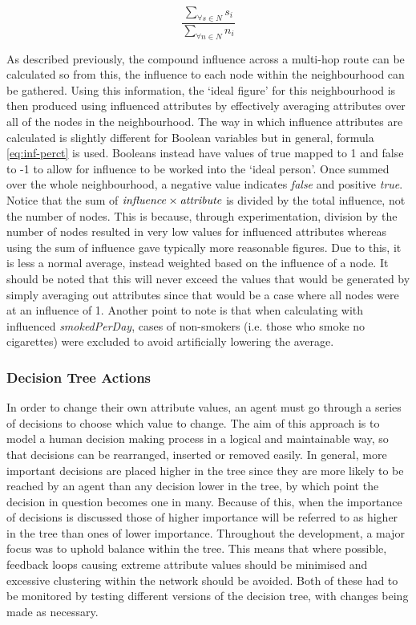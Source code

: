 \documentclass[]{report}
\begin{document}
\begin{equation}
\label{eq:inf-perct}
\frac{\sum_{\forall s \in N} s_{i}}{\sum_{\forall n \in N} n_{i}}
\end{equation}

As described previously, the compound influence across a multi-hop route can be calculated so from this, the influence to each node within the neighbourhood can be gathered. Using this information, the `ideal figure' for this neighbourhood is then produced using influenced attributes by effectively averaging attributes over all of the nodes in the neighbourhood. The way in which influence attributes are calculated is slightly different for Boolean variables but in general, formula \ref{eq:inf-perct} is used. Booleans instead have values of true mapped to 1 and false to -1 to allow for influence to be worked into the `ideal person'. Once summed over the whole neighbourhood, a negative value indicates \emph{false} and positive \emph{true}. Notice that the sum of $\text{\emph{influence}} \times \text{\emph{attribute}}$ is divided by the total influence, not the number of nodes. This is because, through experimentation, division by the number of nodes resulted in very low values for influenced attributes whereas using the sum of influence gave typically more reasonable figures. Due to this, it is less a normal average, instead weighted based on the influence of a node. It should be noted that this will never exceed the values that would be generated by simply averaging out attributes since that would be a case where all nodes were at an influence of 1. Another point to note is that when calculating with influenced \emph{smokedPerDay}, cases of non-smokers (i.e. those who smoke no cigarettes) were excluded to avoid artificially lowering the average.

\label{sec:neighbourhood}

\subsubsection{Decision Tree Actions}
\label{sec:dectree}
In order to change their own attribute values, an agent must go through a series of decisions to choose which value to change. The aim of this approach is to model a human decision making process in a logical and maintainable way, so that decisions can be rearranged, inserted or removed easily. In general, more important decisions are placed higher in the tree since they are more likely to be reached by an agent than any decision lower in the tree, by which point the decision in question becomes one in many. Because of this, when the importance of decisions is discussed those of higher importance will be referred to as higher in the tree than ones of lower importance. Throughout the development, a major focus was to uphold balance within the tree. This means that where possible, feedback loops causing extreme attribute values should be minimised and excessive clustering within the network should be avoided. Both of these had to be monitored by testing different versions of the decision tree, with changes being made as necessary.
\end{document}
